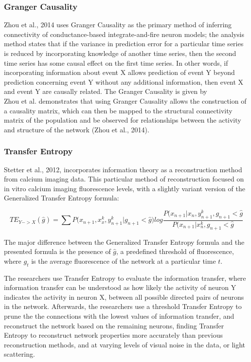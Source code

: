 \documentclass[11pt,titlepage]{article}
\begin{document}
\subsubsection{Granger Causality}
Zhou et al., 2014 uses Granger Causality as the primary method of inferring connectivity of conductance-based integrate-and-fire neuron models; the analysis method states that if the variance in prediction error for a particular time series is reduced by incorporating knowledge of another time series, then the second time series has some causal effect on the first time series. In other words, if incorporating information about event X allows prediction of event Y beyond prediction concerning event Y without any additional information, then event X and event Y are causally related. The Granger Causality is given by 
$$ $$
Zhou et al. demonstrates that using Granger Causality allows the construction of a causality matrix, which can then be mapped to the structural connectivity matrix of the population and be observed for relationships between the activity and structure of the network (Zhou et al., 2014).\par

\subsubsection{Transfer Entropy}
Stetter et al., 2012, incorporates information theory as a reconstruction method from calcium imaging data. This particular method of reconstruction focused on in vitro calcium imaging fluorescence levels, with a slightly variant version of the Generalized Transfer Entropy formula:

$$TE_{Y->X}(\hat{g}) = \sum{P(x_{n+1}, x_x^k,y_{n+1}^k|g_{n+1}<\hat{g}}) log \frac{P(x_{n+1}|x_n,y_{n+1}^k,g_{n+1}<\hat{g}}{P(x_{n+1}|x_n^k,g_{n+1}<\hat{g}}$$

The major difference between the Generalized Transfer Entropy formula and the presented formula is the presence of $\hat{g}$, a predefined threshold of fluorescence, where $g_t$ is the average fluorescence of the network at a particular time $t$.\par

The researchers use Transfer Entropy to evaluate the information transfer, where information transfer can be understood as how likely the activity of neuron Y indicates the activity in neuron X, between all possible directed pairs of neurons in the network. Afterwards, the researchers use a threshold Transfer Entropy to prune the the connections with the lowest values of information transfer, and reconstruct the network based on the remaining neurons, finding Transfer Entropy to reconstruct network properties more accurately than previous reconstruction methods, and at varying levels of visual noise in the data, or light scattering.\par
\end{document}
